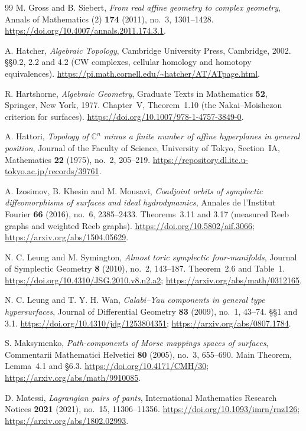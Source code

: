 \begin{thebibliography}{99}
M. Gross and B. Siebert,
\emph{From real affine geometry to complex geometry},
Annals of Mathematics (2) \textbf{174} (2011), no.~3, 1301--1428.
\url{https://doi.org/10.4007/annals.2011.174.3.1}.

A. Hatcher,
\emph{Algebraic Topology},
Cambridge University Press, Cambridge, 2002.
\S\S0.2, 2.2 and 4.2 (CW complexes, cellular homology and homotopy equivalences).
\url{https://pi.math.cornell.edu/~hatcher/AT/ATpage.html}.

R. Hartshorne,
\emph{Algebraic Geometry},
Graduate Texts in Mathematics \textbf{52}, Springer, New York, 1977.
Chapter~V, Theorem~1.10 (the Nakai--Moishezon criterion for surfaces).
\url{https://doi.org/10.1007/978-1-4757-3849-0}.

A. Hattori,
\emph{Topology of $\mathbb C^n$ minus a finite number of affine hyperplanes in general position},
Journal of the Faculty of Science, University of Tokyo, Section~IA, Mathematics
\textbf{22} (1975), no.~2, 205--219.
\url{https://repository.dl.itc.u-tokyo.ac.jp/records/39761}.

A. Izosimov, B. Khesin and M. Mousavi,
\emph{Coadjoint orbits of symplectic diffeomorphisms of surfaces and ideal hydrodynamics},
Annales de l'Institut Fourier \textbf{66} (2016), no.~6, 2385--2433.
Theorems~3.11 and 3.17 (measured Reeb graphs and weighted Reeb graphs).
\url{https://doi.org/10.5802/aif.3066};
\url{https://arxiv.org/abs/1504.05629}.

N. C. Leung and M. Symington,
\emph{Almost toric symplectic four-manifolds},
Journal of Symplectic Geometry \textbf{8} (2010), no.~2, 143--187.
Theorem~2.6 and Table~1.
\url{https://doi.org/10.4310/JSG.2010.v8.n2.a2};
\url{https://arxiv.org/abs/math/0312165}.

N. C. Leung and T. Y. H. Wan,
\emph{Calabi--Yau components in general type hypersurfaces},
Journal of Differential Geometry \textbf{83} (2009), no.~1, 43--74.
\S\S1 and 3.1.
\url{https://doi.org/10.4310/jdg/1253804351};
\url{https://arxiv.org/abs/0807.1784}.

S. Maksymenko,
\emph{Path-components of Morse mappings spaces of surfaces},
Commentarii Mathematici Helvetici \textbf{80} (2005), no.~3, 655--690.
Main Theorem, Lemma~4.1 and \S6.3.
\url{https://doi.org/10.4171/CMH/30};
\url{https://arxiv.org/abs/math/9910085}.

D. Matessi,
\emph{Lagrangian pairs of pants},
International Mathematics Research Notices \textbf{2021} (2021), no.~15, 11306--11356.
\url{https://doi.org/10.1093/imrn/rnz126};
\url{https://arxiv.org/abs/1802.02993}.


\end{thebibliography}
